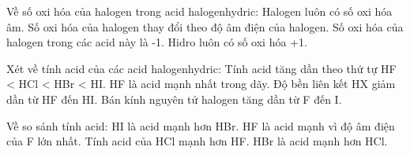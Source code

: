 \documentclass[Main.tex]{subfiles}
\begin{document}
    \begin{ex}
    Về số oxi hóa của halogen trong acid halogenhydric:
    \choiceTF
    {\True Halogen luôn có số oxi hóa âm.}
    {Số oxi hóa của halogen thay đổi theo độ âm điện của halogen.}
    {\True Số oxi hóa của halogen trong các acid này là -1.}
    {\True Hidro luôn có số oxi hóa +1.}
    \end{ex}
    
    \begin{ex}
    Xét về tính acid của các acid halogenhydric:
    \choiceTF
    {\True Tính acid tăng dần theo thứ tự HF < HCl < HBr < HI.}
    {HF là acid mạnh nhất trong dãy.}
    {\True Độ bền liên kết HX giảm dần từ HF đến HI.}
    {\True Bán kính nguyên tử halogen tăng dần từ F đến I.}
    \end{ex}
    
    \begin{ex}
    Về so sánh tính acid:
    \choiceTF
    {\True HI là acid mạnh hơn HBr.}
    {HF là acid mạnh vì độ âm điện của F lớn nhất.}
    {\True Tính acid của HCl mạnh hơn HF.}
    {\True HBr là acid mạnh hơn HCl.}
    \end{ex}
    
\end{document}
